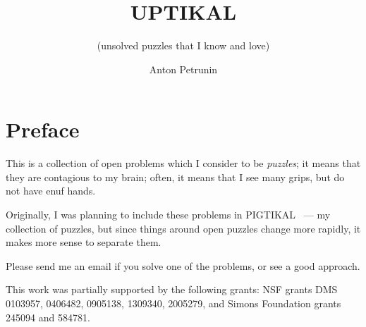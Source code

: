 \documentclass[twoside]{book}
\begin{document}

\title{UPTIKAL}
\subtitle{(unsolved puzzles that I know and love)}
\author{Anton Petrunin}
\date{}
\maketitle




\newpage
\thispagestyle{empty}
\section*{Preface}

This is a collection of open problems which I consider to be \emph{puzzles};
it means that they are contagious to my brain;
often, it means that I see many grips, but do not have enuf hands.

Originally, I was planning to include these problems in PIGTIKAL~\cite{petrunin2021pigtikal} --- my collection of puzzles,
but since things around open puzzles change more rapidly, it makes more sense to separate them.

Please send me an email if you solve one of the problems, or see a good approach.


This work was partially supported by the following grants:
NSF grants DMS 
0103957,
0406482,
0905138,
1309340,
2005279,
and Simons Foundation grants 
245094 and 584781.

\null\vfill{}






\backmatter
\newpage
{}
{\scriptsize

}
\sloppy
\printbibliography[heading=bibintoc]
\fussy
\end{document}
